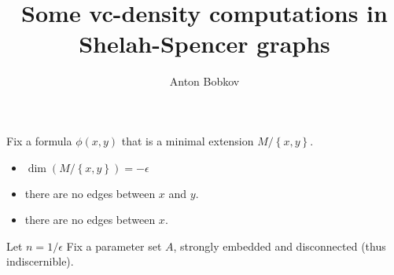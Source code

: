 \documentclass{amsart}
\newcommand{\curly}[1]{\left\{#1\right\}}
\newcommand{\paren}[1]{\left(#1\right)}
\DeclareMathOperator{\dim}{dim}
\begin{document}
\title{Some vc-density computations in Shelah-Spencer graphs}
\author{Anton Bobkov}

Fix a formula $\phi(x, y)$ that is a minimal extension $M/\curly{x,y}$. 
\begin{itemize}
	\item $\dim \paren{M/\curly{x,y}} = -\epsilon$
	\item there are no edges between $x$ and $y$.
	\item there are no edges between $x$.
\end{itemize}

Let $n = 1/\epsilon$
Fix a parameter set $A$, strongly embedded and disconnected (thus indiscernible).
\end{document}
